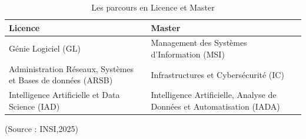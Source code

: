 \label{page:tableau1}
\begin{table}[htbp]
    \centering
    \begin{tabular}{|p{6cm}|p{6cm}|}
        \hline
        \textbf{Licence} & \textbf{Master} \\
        \hline
        Génie Logiciel (GL) & Management des Systèmes d'Information (MSI) \\
        \hline
        Administration Réseaux, Systèmes et Bases de données (ARSB) & Infrastructures et Cybersécurité (IC) \\
        \hline
        Intelligence Artificielle et Data Science (IAD) & Intelligence Artificielle, Analyse de Données et Automatisation (IADA) \\
        \hline
    \end{tabular}
    \caption{Les parcours en Licence et Master}
    \label{tab:parcours_licence_master}
    \small\vspace{0.3em}
    \small (Source : INSI,2025)
\end{table}

